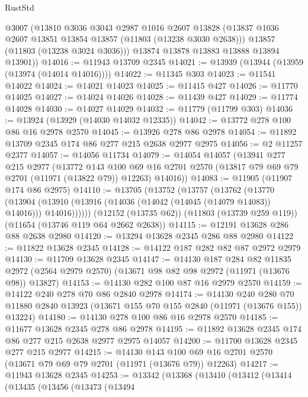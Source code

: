 \begin{lexlean}{RustStd}
\begin{coremodule}
        @3007
        (@13810
          @3036
          @3043
          @2987
          @1016
          @2607
          @13828
          (@13837 @1036 @2607 @13851 @13854 @13857 (@11803 (@13238 @3030 @2638)))
          @13857
          (@11803 (@13238 @3024 @3036)))
        @13874
        @13878
        @13883
        @13888
        @13894
        @13901))
@14016 := @11943 @13709 @2345
@14021 := @13939 (@13944 (@13959 (@13974 (@14014 @14016))))
@14022 := @11345 @303
@14023 := @11541 @14022
@14024 := @14021 @14023
@14025 := @11415 @427
@14026 := @11770 @14025
@14027 := @14024 @14026
@14028 := @11439 @427
@14029 := @11774 @14028
@14030 := @14027 @14029
@14032 := @11779 (@11799 @303)
@14036 := @13924 (@13929 (@14030 @14032 @12335))
@14042 := @13772 @278 @100 @86 @16 @2978 @2570
@14045 := @13926 @278 @86 @2978
@14054 := @11892 @13709 @2345 @174 @86 @277 @215 @2638 @2977 @2975
@14056 := @2 @11257 @2377
@14057 := @14056 @11734
@14079 := @14054
    @14057
    (@13941
      @277
      @215
      @2977
      (@13772
        @143
        @100
        @69
        @16
        @2701
        @2570
        (@13817 @79 @69 @79 @2701 (@11971 (@13822 @79)) @12263)
        @14016))
@14083 := @11905 (@11907 @174 @86 @2975)
@14110 := @13705
    (@13752
      (@13757
        (@13762
          (@13770
            (@13904 (@13910 (@13916 (@14036 (@14042 (@14045 (@14079 @14083)) @14016))) @14016))))))
    (@12152 (@13735 @62))
    (@11803 (@13739 @259 @119))
    (@11654 (@13746 @119 @64 @2662 @2638))
@14115 := @12191 @13628 @286 @88 @2638 @2980
@14120 := @13294 @13628 @2345 @286 @88 @2980
@14122 := @11822 @13628 @2345
@14128 := @14122 @187 @282 @82 @87 @2972 @2979
@14130 := @11709 @13628 @2345
@14147 := @14130
    @187
    @284
    @82
    @11835
    @2972
    (@2564 @2979 @2570)
    (@13671 @98 @82 @98 @2972 (@11971 (@13676 @98)) @13827)
@14153 := @14130 @282 @100 @87 @16 @2979 @2570
@14159 := @14122 @240 @278 @70 @86 @2840 @2978
@14174 := @14130
    @240
    @280
    @70
    @11880
    @2840
    @13923
    (@13671 @155 @70 @155 @2840 (@11971 (@13676 @155)) @13224)
@14180 := @14130 @278 @100 @86 @16 @2978 @2570
@14185 := @11677 @13628 @2345 @278 @86 @2978
@14195 := @11892 @13628 @2345 @174 @86 @277 @215 @2638 @2977 @2975 @14057
@14200 := @11700 @13628 @2345 @277 @215 @2977
@14215 := @14130
    @143
    @100
    @69
    @16
    @2701
    @2570
    (@13671 @79 @69 @79 @2701 (@11971 (@13676 @79)) @12263)
@14217 := @11943 @13628 @2345
@14253 := @13342
    (@13368
      (@13410
        (@13412
          (@13414
            (@13435
              (@13456
                (@13473
                  (@13494

\end{coremodule}
\end{lexlean}
